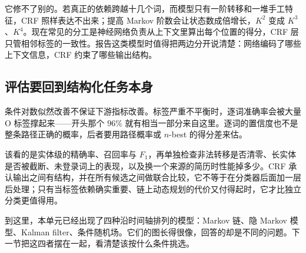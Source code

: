 它修不了别的。若真正的依赖跨越十几个词，而模型只有一阶转移和一堆手工特征，CRF 照样表达不出来；提高 Markov 阶数会让状态数成倍增长，\(K^2\) 变成 \(K^3\)、\(K^4\)。现在常见的分工是神经网络负责从上下文里算出每个位置的得分，CRF 层只管相邻标签的一致性。报告这类模型时值得把两边分开说清楚：网络编码了哪些上下文信息，CRF 约束了哪些输出结构。

\subsection{评估要回到结构化任务本身}

条件对数似然改善不保证下游指标改善。标签严重不平衡时，逐词准确率会被大量 O 标签撑起来——开头那个 \(96\%\) 就有相当一部分来自这里。逐词的置信度也不是整条路径正确的概率，后者要用路径概率或 \(n\)-best 的得分差来估。

该看的是实体级的精确率、召回率与 \(F_1\)，再单独检查非法转移是否清零、长实体是否被截断、未登录词上的表现，以及换一个来源的简历时性能掉多少。CRF 承认输出之间有结构，并在所有候选之间做联合比较，它不等于在分类器后面加一层后处理；只有当标签依赖确实重要、链上动态规划的代价又付得起时，它才比独立分类更值得用。

到这里，本单元已经出现了四种沿时间轴排列的模型：Markov 链、隐 Markov 模型、Kalman filter、条件随机场。它们的图长得很像，回答的却是不同的问题。下一节把这四者摆在一起，看清楚该按什么条件挑选。
